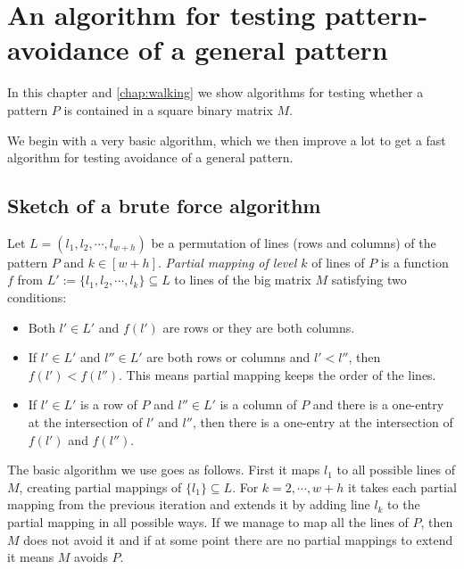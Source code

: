 \chapter{An algorithm for testing pattern-avoidance of a general pattern}
\label{chap:general}
In this chapter and \autoref{chap:walking} we show algorithms for testing whether a pattern $P$ is contained in a square binary matrix $M$.

We begin with a very basic algorithm, which we then improve a lot to get a fast algorithm for testing avoidance of a general pattern.

\section{Sketch of a brute force algorithm}
Let $L=(l_1,l_2,\cdots,l_{w+h})$ be a permutation of lines (rows and columns) of the pattern $P$ and $k\in[w+h]$. \emph{Partial mapping of level $k$} of lines of $P$ is a function $f$ from $L':=\{l_1,l_2,\cdots,l_k\}\subseteq L$ to lines of the big matrix $M$ satisfying two conditions: 
\begin{itemize}
\item Both $l'\in L'$ and $f(l')$ are rows or they are both columns.
\item If $l'\in L'$ and $l''\in L'$ are both rows or columns and $l'<l''$, then $f(l')<f(l'')$. This means partial mapping keeps the order of the lines.
\item If $l'\in L'$ is a row of $P$ and $l''\in L'$ is a column of $P$ and there is a one-entry at the intersection of $l'$ and $l''$, then there is a one-entry at the intersection of $f(l')$ and $f(l'')$.
\end{itemize}
The basic algorithm we use goes as follows. First it maps $l_1$ to all possible lines of $M$, creating partial mappings of $\{l_1\}\subseteq L$. For $k=2,\cdots,w+h$ it takes each partial mapping from the previous iteration and extends it by adding line $l_k$ to the partial mapping in all possible ways. If we manage to map all the lines of $P$, then $M$ does not avoid it and if at some point there are no partial mappings to extend it means $M$ avoids $P$.


